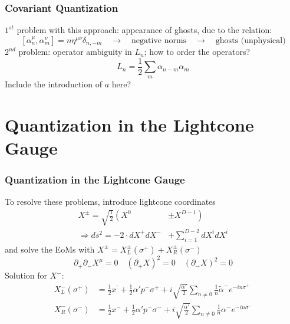 \documentclass[aspectratio=169]{beamer}
\begin{document}
	\begin{frame}
		\frametitle{Covariant Quantization}
		$1^{st}$ problem with this approach: appearance of ghosts, due to the relation:
		\begin{equation*}
			\left[\alpha^\mu_n, \alpha^\nu_m\right] = n \eta^{\mu\nu} \delta_{n,-m} \quad \rightarrow \quad \text{negative norms} \quad \rightarrow \quad \text{ghosts (unphysical)}
		\end{equation*}
		$2^{nd}$ problem: operator ambiguity in $L_n$; how to order the operators?
		\begin{equation*}
			L_n = \frac{1}{2} \sum_{m} \alpha_{n-m} \alpha_m
		\end{equation*}
		\color{red} \Large Include the introduction of $a$ here?
	\end{frame}

	\section{Quantization in the Lightcone Gauge}
	
	\begin{frame}
		\frametitle{Quantization in the Lightcone Gauge}
		To resolve these problems, introduce lightcone coordinates \color{red}{how deeply?} \color{black}
		\begin{align*}
			X^\pm = \sqrt{\frac{1}{2}} \left(X^0\right.&\left.\pm X^{D-1}\right)\\
			\Rightarrow ds^2 = -2\cdot dX^+dX^- &+ \sum_{i=1}^{D-2}dX^idX^i
		\end{align*}
		and solve the EoMs with $X^\pm = X^\pm_L(\sigma^+) + X^\pm_R(\sigma^-)$
		\begin{equation*}
				\partial_+\partial_-X^\mu = 0 \quad (\partial_+X)^2 = 0 \quad (\partial_-X)^2 = 0 
		\end{equation*}
		Solution for $X^-$:
		\begin{align*}
			X^-_L(\sigma^+) &= \frac{1}{2}x^⁻ + \frac{1}{2} \alpha' p^- \sigma^+ + i \sqrt{\frac{\alpha'}{2}} \sum_{n\neq 0} \frac{1}{n}\tilde{\alpha}^- e^{-in\sigma^+}\\
			X^-_R(\sigma^-) &= \frac{1}{2}x^- + \frac{1}{2} \alpha' p^-\sigma^- + i \sqrt{\frac{\alpha'}{2}} \sum_{n\neq 0} \frac{1}{n}\alpha^- e^{-in\sigma^-} \\
		\end{align*}
	\end{frame}
\end{document}
